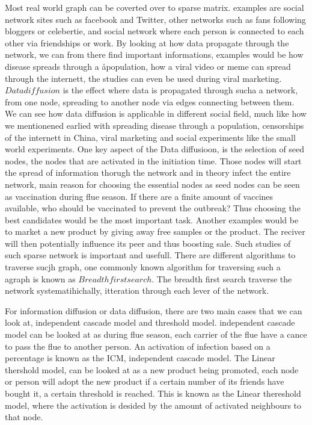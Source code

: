 Most real world graph can be coverted over to sparse matrix. examples are social network sites such as facebook and Twitter, other networks such as fans following bloggers or celebertie, and social network where each person is connected to each other via friendships or work. By looking at how data propagate through the network, we can from there find important informations, examples would be how disease spreads through a åpopulation, how a viral video or meme can spread through the internett, the studies can even be used during viral marketing. $Data diffusion$ is the effect where data is propagated through sucha a network, from one node, spreading to another node via edges connecting between them. We can see how data diffusion is applicable in different social field, much like how we mentionened earlied with spreading disease through a population, censorships of the internett in China, viral marketing and social experiments like the small world experiments. One key aspect of the Data diffusioon, is the selection of seed nodes, the nodes that are activated in the initiation time. Those nodes will start the spread of information thorugh the network and in theory infect the entire network, main reason for choosing the essential nodes as seed nodes can be seen as vaccination during flue season. If there are a finite amount of vaccines available, who should be vaccinated to prevent the outbreak? Thus choosing the best candidates would be the most important task. Another examples would be to market a new product by giving away free samples or the product. The reciver will then potentially influence its peer and thus boosting sale. Such studies of such sparse network is important and usefull. There are different algorithms to traverse sucjh graph, one commonly known algorithm for traversing such a agraph is known as $Breadth first search$. The breadth first search traverse the network systematihichally, itteration through each lever of the network. 

For information diffusion or data diffusion, there are two main cases that we can look at, independent cascade model and threshold model. independent cascade model can be looked at as during flue season, each carrier of the flue have a cance to pass the flue to another person. An activation of infection based on a percentage is known as the ICM, independent cascade model. The Linear thershold model, can be looked at as a new product being promoted, each node or person will adopt the new product if a certain number of its friends have bought it, a certain threshold is reached. This is known as the Linear thereshold model, where the activation is desided by the amount of activated neighbours to that node. 

